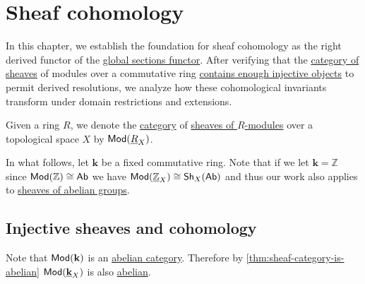 \documentclass[../../main]{subfiles}
\begin{document}
\chapter{Sheaf cohomology}

In this chapter, we establish the foundation for sheaf cohomology as the right derived functor of the \hyperref[def:global-sections-sheaf]{global sections functor}.
After verifying that the \hyperref[def:sheaf]{category of sheaves} of modules over a commutative ring \hyperref[def:enough-injectives-projectives]{contains enough injective objects} to permit derived resolutions, we analyze how these cohomological invariants transform under domain restrictions and extensions.

\begin{notation}
  Given a ring \(R\), we denote the \hyperref[def:category]{category} of \hyperref[def:sheaf]{sheaves of \(R\)-modules} over a topological space \(X\) by \(\mathsf{Mod}(\underline{R}_{X})\).
\end{notation}

In what follows, let \(\mathbf{k}\) be a fixed commutative ring.
Note that if we let \(\mathbf{k} = \mathbb{Z}\) since \(\mathsf{Mod}(\mathbb{Z}) \cong \mathsf{Ab}\) we have \(\mathsf{Mod}(\underline{\mathbb{Z}}_{X}) \cong \mathsf{Sh}_{X}(\mathsf{Ab})\) and thus our work also applies to \hyperref[def:sheaf]{sheaves of abelian groups}.

\section{Injective sheaves and cohomology}


Note that \(\mathsf{Mod}(\mathbf{k})\) is an \hyperref[def:abelian-category]{abelian category}.
Therefore by \autoref{thm:sheaf-category-is-abelian} \(\mathsf{Mod}(\underline{\mathbf{k}}_{X})\) is also \hyperref[def:abelian-category]{abelian}.
\end{document}
